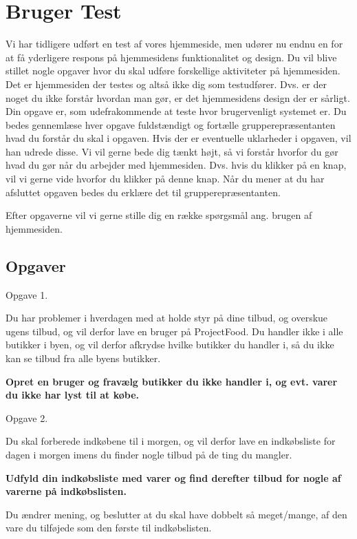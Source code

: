 \chapter{Bruger Test}\label{b:brugertest1}

Vi har tidligere udført en test af vores hjemmeside, men udører nu endnu en for at få yderligere respons på hjemmesidens funktionalitet og design.
Du vil blive stillet nogle opgaver hvor du skal udføre forskellige aktiviteter på hjemmesiden.
Det er hjemmesiden der testes og altså ikke dig som testudfører.
Dvs. er der noget du ikke forstår hvordan man gør, er det hjemmesidens design der er sårligt.
Din opgave er, som udefrakommende at teste hvor brugervenligt systemet er. 
Du bedes gennemlæse hver opgave fuldstændigt og fortælle grupperepræsentanten hvad du forstår du skal i opgaven.
Hvis der er eventuelle uklarheder i opgaven, vil han udrede disse.
Vi vil gerne bede dig tænkt højt, så vi forstår hvorfor du gør hvad du gør når du arbejder med hjemmesiden.
Dvs. hvis du klikker på en knap, vil vi gerne vide hvorfor du klikker på denne knap.
Når du mener at du har afsluttet opgaven bedes du erklære det til grupperepræsentanten.

Efter opgaverne vil vi gerne stille dig en række spørgsmål ang. brugen af hjemmesiden.

\section{Opgaver}

Opgave 1.

Du har problemer i hverdagen med at holde styr på dine tilbud, og overskue ugens tilbud, og vil derfor lave en bruger på ProjectFood.
Du handler ikke i alle butikker i byen, og vil derfor afkrydse hvilke butikker du handler i, så du ikke kan se tilbud fra alle byens butikker.

\textbf{Opret en bruger og fravælg butikker du ikke handler i, og evt. varer du ikke har lyst til at købe. }

Opgave 2.

Du skal forberede indkøbene til i morgen, og vil derfor lave en indkøbsliste for dagen i morgen imens du finder nogle tilbud på de ting du mangler.

\textbf{Udfyld din indkøbsliste med varer og find derefter tilbud for nogle af varerne på indkøbslisten.}

Du ændrer mening, og beslutter at du skal have dobbelt så meget/mange, af den vare du tilføjede som den første til indkøbslisten.

